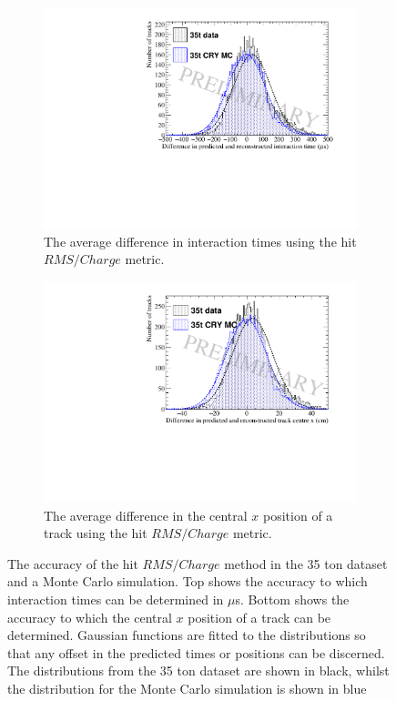 \begin{figure}[h!]
  \centering
  \begin{subfigure}{0.6\textwidth}
    \centering
    \includegraphics[width=\textwidth]{Overlay_AvTimeDiff_RMS_Int}
    \caption{The average difference in interaction times using the hit $RMS/Charge$ metric.}
    \label{fig:DiffOverlayAvDiff_RMS_Int_T}
  \end{subfigure}

  \begin{subfigure}{0.6\textwidth}
    \centering
    \includegraphics[width=\textwidth]{Overlay_AvXPosDiff_RMS_Int}
    \caption{The average difference in the central $x$ position of a track using the hit $RMS/Charge$ metric.}
    \label{fig:DiffOverlayAvDiff_RMS_Int_X}
  \end{subfigure}
  \caption[Comparing the accuracy of the hit $RMS$ method in the 35 ton dataset and a Monte Carlo simulation]
          {The accuracy of the hit $RMS/Charge$ method in the 35 ton dataset and a Monte Carlo simulation. Top shows the accuracy to which interaction times can be determined in $\mu$s. Bottom shows the accuracy to which the central $x$ position of a track can be determined. Gaussian functions are fitted to the distributions so that any offset in the predicted times or positions can be discerned. The distributions from the 35 ton dataset are shown in black, whilst the distribution for the Monte Carlo simulation is shown in blue}
  \label{fig:DiffOverlayAvDiff_RMS_Int}
\end{figure}

